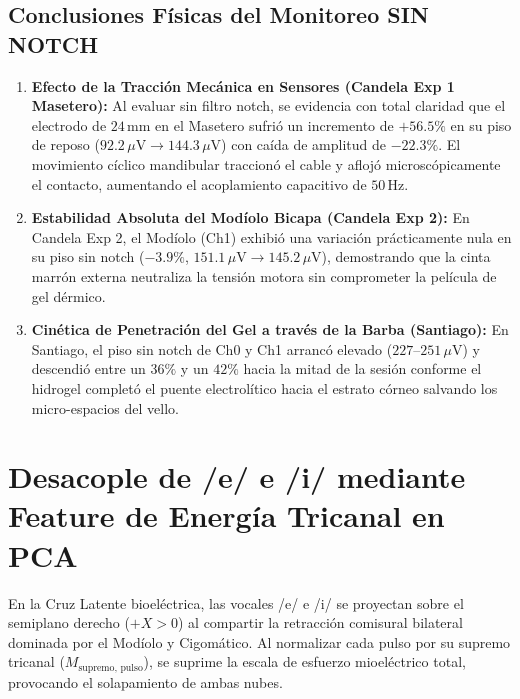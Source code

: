 \documentclass[11pt,a4paper]{article}
\begin{document}
\subsection{Conclusiones Físicas del Monitoreo SIN NOTCH}
\begin{enumerate}
    \item \textbf{Efecto de la Tracción Mecánica en Sensores (Candela Exp 1 Masetero):}
    Al evaluar sin filtro notch, se evidencia con total claridad que el electrodo de $24\,\text{mm}$ en el Masetero sufrió un incremento de $+56.5\%$ en su piso de reposo ($92.2\,\mu\text{V} \to 144.3\,\mu\text{V}$) con caída de amplitud de $-22.3\%$. El movimiento cíclico mandibular traccionó el cable y aflojó microscópicamente el contacto, aumentando el acoplamiento capacitivo de $50\,\text{Hz}$.
    \item \textbf{Estabilidad Absoluta del Modíolo Bicapa (Candela Exp 2):}
    En Candela Exp 2, el Modíolo (Ch1) exhibió una variación prácticamente nula en su piso sin notch ($-3.9\%$, $151.1\,\mu\text{V} \to 145.2\,\mu\text{V}$), demostrando que la cinta marrón externa neutraliza la tensión motora sin comprometer la película de gel dérmico.
    \item \textbf{Cinética de Penetración del Gel a través de la Barba (Santiago):}
    En Santiago, el piso sin notch de Ch0 y Ch1 arrancó elevado ($227\text{--}251\,\mu\text{V}$) y descendió entre un $36\%$ y un $42\%$ hacia la mitad de la sesión conforme el hidrogel completó el puente electrolítico hacia el estrato córneo salvando los micro-espacios del vello.
\end{enumerate}

\section{Desacople de /e/ e /i/ mediante Feature de Energía Tricanal en PCA}

En la Cruz Latente bioeléctrica, las vocales /e/ e /i/ se proyectan sobre el semiplano derecho ($+X > 0$) al compartir la retracción comisural bilateral dominada por el Modíolo y Cigomático. Al normalizar cada pulso por su supremo tricanal ($M_{\text{supremo, pulso}}$), se suprime la escala de esfuerzo mioeléctrico total, provocando el solapamiento de ambas nubes.
\end{document}
